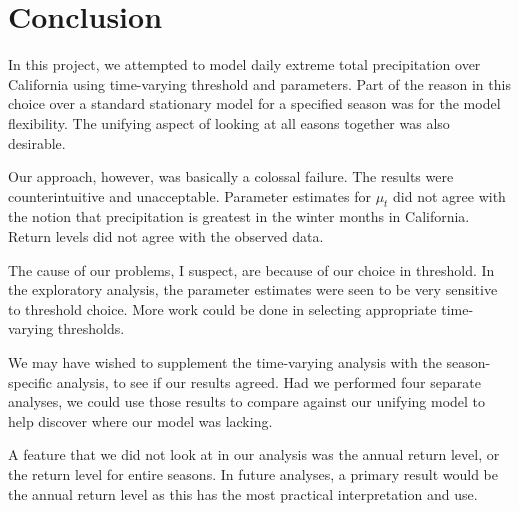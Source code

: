 \documentclass[12pt]{article}
\begin{document}
\section*{Conclusion}

\noindent In this project, we attempted to model daily extreme total precipitation over California using time-varying threshold and parameters. Part of the reason in this choice over a standard stationary model for a specified season was for the model flexibility. The unifying aspect of looking at all easons together was also desirable.
\bigskip

\noindent Our approach, however, was basically a colossal failure. The results were counterintuitive and unacceptable. Parameter estimates for $\mu_t$ did not agree with the notion that precipitation is greatest in the winter months in California. Return levels did not agree with the observed data.
\bigskip

\noindent The cause of our problems, I suspect, are because of our choice in threshold. In the exploratory analysis, the parameter estimates were seen to be very sensitive to threshold choice. More work could be done in selecting appropriate time-varying thresholds.
\bigskip

\noindent We may have wished to supplement the time-varying analysis with the season-specific analysis, to see if our results agreed. Had we performed four separate analyses, we could use those results to compare against our unifying model to help discover where our model was lacking.
\bigskip

\noindent A feature that we did not look at in our analysis was the annual return level, or the return level for entire seasons. In future analyses, a primary result would be the annual return level as this has the most practical interpretation and use.
\end{document}
